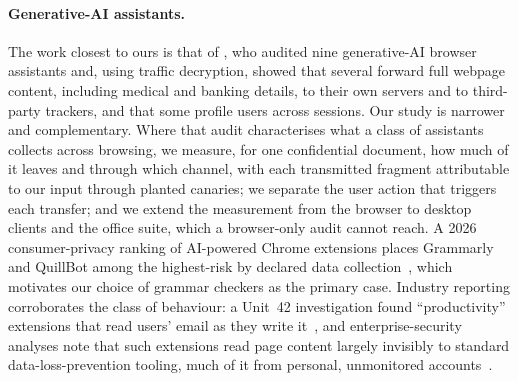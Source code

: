 \documentclass[sigconf,anonymous,review,balance=false]{acmart}
\begin{document}
\paragraph{Generative-AI assistants.}
The work closest to ours is that of \citet{vekaria2025bighelp}, who audited nine
generative-AI browser assistants and, using traffic decryption, showed that several forward
full webpage content, including medical and banking details, to their own servers and to
third-party trackers, and that some profile users across sessions. Our study is narrower
and complementary. Where that audit characterises what a class of assistants collects across
browsing, we measure, for one confidential document, how much of it leaves and through which
channel, with each transmitted fragment attributable to our input through planted canaries;
we separate the user action that triggers each transfer; and we extend the measurement from
the browser to desktop clients and the office suite, which a browser-only audit cannot
reach. A 2026 consumer-privacy ranking of AI-powered Chrome extensions places Grammarly and
QuillBot among the highest-risk by declared data collection~\cite{incogni2026ranking},
which motivates our choice of grammar checkers as the primary case. Industry reporting corroborates the class of behaviour: a Unit~42 investigation found
``productivity'' extensions that read users' email as they write it~\cite{unit42genai2026},
and enterprise-security analyses note that such extensions read page content largely
invisibly to standard data-loss-prevention tooling, much of it from personal, unmonitored
accounts~\cite{csa2026extensions,cyberhaven2026}.
\end{document}
